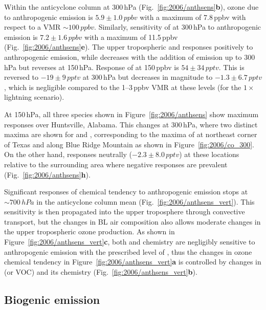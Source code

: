 Within the anticyclone column at 300\,\unit{hPa} (Fig.~\ref{fig:2006/anthsens}{\bf b}), ozone due to anthropogenic emission
is $5.9\pm1.0\,\unit{ppbv}$ with a maximum of 7.8\,\unit{ppbv} with respect to a VMR $\sim100\,\unit{ppbv}$. Similarly,
sensitivity of  at 300\,\unit{hPa} to anthropogenic emission is $7.2\pm1.6\,\unit{ppbv}$ with a maximum of
11.5\,\unit{ppbv} (Fig.~\ref{fig:2006/anthsens}{\bf e}). The upper tropospheric  and  responses
positively to anthropogenic emission, while  decreases with the addition of emission up to 300\,\unit{hPa}
but reverses at 150\,\unit{hPa}. Response of  at 150\,\unit{ppbv} is $54\pm34\,\unit{pptv}$. This is reversed
to $-19\pm9\,\unit{pptv}$ at 300\,\unit{hPa} but decreases in magnitude to $-1.3\pm6.7\,\unit{pptv}$, which is negligible
compared to the 1--3\,\unit{ppbv} VMR at these levels (for the $1\times$ lightning scenario).

At 150\,\unit{hPa}, all three species shown in Figure~\ref{fig:2006/anthsens} show maximum responses over Huntsville,
Alabama. This changes at 300\,\unit{hPa}, where two distinct maxima are shown for  and ,
corresponding to the maxima of  at northeast corner of Texas and along Blue Ridge Mountain as shown in
Figure~\ref{fig:2006/co_300}. On the other hand,  responses neutrally ($-2.3\pm8.0\,\unit{pptv}$) at
these locations relative to the surrounding area where negative responses are prevalent (Fig.~\ref{fig:2006/anthsens}{\bf h}).

Significant responses of chemical tendency to anthropogenic emission stops at $\sim700\,\unit{hPa}$ in the anticyclone
column mean (Fig.~\ref{fig:2006/anthsens_vert}). This sensitivity is then propagated into the upper troposphere through
convective transport, but the changes in BL air composition also allows moderate changes in the upper tropospheric
ozone production. As shown in Figure~\ref{fig:2006/anthsens_vert}{\bf c}, both  and  chemistry
are negligibly sensitive to anthropogenic emission with the prescribed level of {\lnox}, thus the changes in ozone chemical
tendency in Figure~\ref{fig:2006/anthsens_vert}{\bf a} is controlled by changes in  (or VOC) and its chemistry
(Fig.~\ref{fig:2006/anthsens_vert}{\bf b}).

\subsection{Biogenic emission}\label{ssec:2006/sens/bio}


